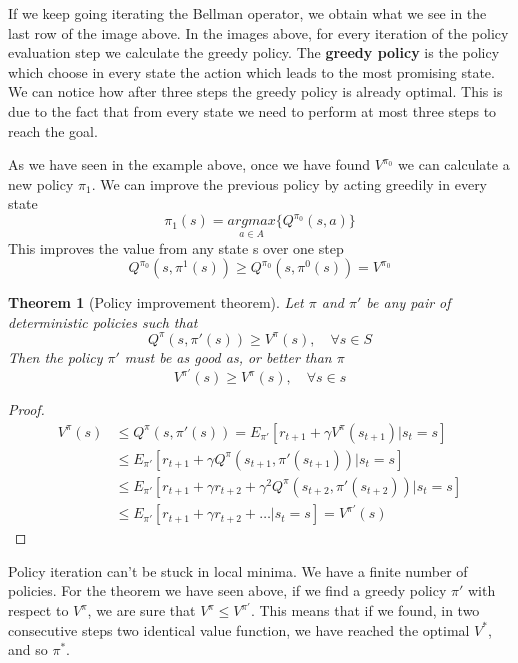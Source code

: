 \documentclass[main.tex]{subfiles}
\newtheorem{theorem}{Theorem}[section]
\begin{document}
If we keep going iterating the Bellman operator, we obtain what we see in the last row of the image above. In the images above, for every iteration of the policy evaluation step we calculate the greedy policy. The \textbf{greedy policy} is the policy which choose in every state the action which leads to the most promising state. We can notice how after three steps the greedy policy is already optimal. This is due to the fact that from every state we need to perform at most three steps to reach the goal.
\newline
\par
\noindent
As we have seen in the example above, once we have found $V^{\pi_0}$ we can calculate a new policy $\pi_1$. We can improve the previous policy by acting greedily in every state
\begin{equation*}
    \pi_1(s) = \underset{a \in A}{argmax} \bigg\{ Q^{\pi_0}(s,a) \bigg\}
\end{equation*}
This improves the value from any state s over one step
\begin{equation*}
    Q^{\pi_0}(s, \pi^1(s)) \geq Q^{\pi_0}(s, \pi^0(s)) = V^{\pi_0}
\end{equation*}

\begin{theorem}[Policy improvement theorem]
    Let $\pi$ and $\pi'$ be any pair of deterministic policies such that
    \begin{equation*}
        Q^{\pi}(s, \pi'(s)) \geq V^{\pi}(s), \quad \forall s \in S
    \end{equation*}
    Then the policy $\pi'$ must be as good as, or better than $\pi$
    \begin{equation*}
        V^{\pi'}(s) \geq V^{\pi}(s), \quad \forall s \in s
    \end{equation*}
\end{theorem}
\begin{proof}
    \begin{align*}
        V^{\pi}(s) & \leq Q^{\pi}(s,\pi'(s)) = E_{\pi'}[r_{t+1} + \gamma V^{\pi}(s_{t+1})|s_t=s]              \\
                   & \leq E_{\pi'}[r_{t+1} + \gamma Q^{\pi}(s_{t+1}, \pi'(s_{t+1}))|s_t=s]                    \\
                   & \leq E_{\pi'}[r_{t+1} + \gamma r_{t+2} + \gamma^2 Q^{\pi}(s_{t+2}, \pi'(s_{t+2}))|s_t=s] \\
                   & \leq E_{\pi'}[r_{t+1} + \gamma r_{t+2} + \dots|s_t=s] = V^{\pi'}(s)
    \end{align*}
\end{proof}
\par
\noindent
Policy iteration can't be stuck in local minima. We have a finite number of policies. For the theorem we have seen above, if we find a greedy policy $\pi'$ with respect to $V^{\pi}$, we are sure that $V^{\pi} \leq V^{\pi'}$. This means that if we found, in two consecutive steps two identical value function, we have reached the optimal $V^*$, and so $\pi^*$.
\end{document}
